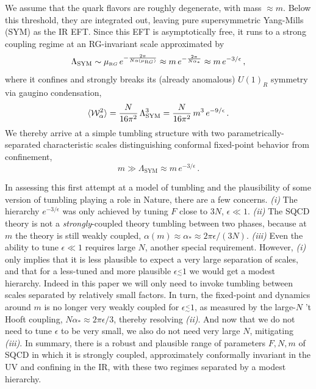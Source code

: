\documentclass[a4paper,12pt]{article}
\newcommand{\lsim}{\stackrel{<}{_\sim}}
\def\muRG{\mu_{\scriptscriptstyle{\textrm RG}}}
\begin{document}
We assume that the quark flavors are roughly degenerate, with mass $\approx m$. Below this threshold, they are integrated out, leaving pure supersymmetric Yang-Mills (SYM) as the IR EFT. Since this EFT is asymptotically free, it runs to a strong coupling regime at an RG-invariant scale approximated by
\begin{equation}
\Lambda_{\textrm{SYM}} \sim \muRG \, e^{- \frac{2 \pi}{N \alpha(\muRG)}} \approx m\, e^{- \frac{2 \pi}{N \alpha_*}} \approx m\, e^{- {3}/{ \epsilon}}\, ,
\end{equation}
where it confines and strongly breaks its (already anomalous) $U(1)_R$ symmetry via gaugino condensation,
\begin{equation}
   \langle {\cal W}_{\alpha}^2 \rangle = \frac{N}{16 \pi^2}\, \Lambda_{\textrm{SYM}}^3  = \frac{N}{16 \pi^2} \,m^3 \,e^{- 9/{\epsilon}}\, .
\end{equation}
We thereby arrive at a simple tumbling structure with two parametrically-separated characteristic scales distinguishing conformal fixed-point behavior from confinement,
\begin{equation}
   m \gg \Lambda_{\textrm{SYM}} \approx m \, e^{- 3/ \epsilon}\, .
\end{equation}

In assessing this first attempt at a model of tumbling and the plausibility of some version of tumbling playing a role in Nature, there are a few concerns. {\it (i)} The hierarchy $e^{- 3/ \epsilon}$ was only achieved by tuning $F$ close to $3N$, $\epsilon \ll 1$. {\it (ii)} The SQCD theory is not a {\it strongly}-coupled theory tumbling between two phases, because at $m$ the theory is still weakly coupled, $\alpha(m) \approx \alpha_* \approx 2 \pi \epsilon/(3N)$.
{\it (iii)} Even the ability to tune $\epsilon \ll 1$ requires large $N$, another special requirement.
However, {\it (i)} only implies that it is less plausible to expect a very large separation of scales, and that for a less-tuned and more plausible $\epsilon \lsim 1$ we would get a modest hierarchy. Indeed in this paper we will only need to invoke tumbling between scales separated by relatively small factors. In turn, the fixed-point and dynamics around $m$ is no longer very weakly coupled for $\epsilon \lsim 1$, as measured by the large-$N$ 't Hooft coupling,
$N \alpha_* \approx 2 \pi \epsilon/3$, thereby resolving {\it (ii)}.
And now that we do not need to tune $\epsilon$ to be very small, we also do not need very large $N$, mitigating {\it (iii)}. In summary, there is a robust and plausible range of parameters $F, N, m$  of SQCD in which it is strongly coupled, approximately conformally invariant in the UV and confining in the IR, with these two regimes separated by a modest hierarchy.
\end{document}
